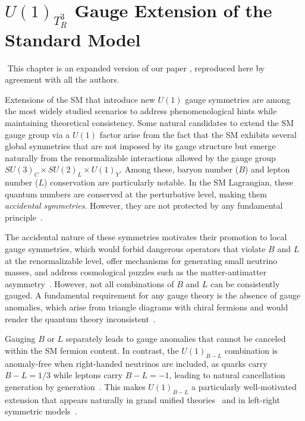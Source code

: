 \chapter{$U(1)_{T^3_R}$ Gauge Extension of the Standard Model}\label{ch:U1T3R}
{$ $ \scriptsize \hfill This chapter is an expanded version of our paper \cite{Qureshi:2024naw}, reproduced here by agreement with all the authors.}

Extensions of the SM that introduce new $U(1)$ gauge symmetries are among the most widely studied scenarios to address phenomenological hints while maintaining theoretical consistency. Some natural candidates to extend the SM gauge group via a $U(1)$ factor arise from the fact that the SM exhibits several global symmetries that are not imposed by its gauge structure but emerge naturally from the renormalizable interactions allowed by the gauge group $SU(3)_C \times SU(2)_L \times U(1)_Y$. Among these, baryon number ($B$) and lepton number ($L$) conservation are particularly notable. In the SM Lagrangian, these quantum numbers are conserved at the perturbative level, making them \textit{accidental symmetries}. However, they are not protected by any fundamental principle~\parencite{Weinberg:1979sa, Wilczek:1979hc}.

The accidental nature of these symmetries motivates their promotion to local gauge symmetries, which would forbid dangerous operators that violate $B$ and $L$ at the renormalizable level, offer mechanisms for generating small neutrino masses, and address cosmological puzzles such as the matter-antimatter asymmetry~\parencite{Marshak:1979fm, Mohapatra:1980yp, Buchmuller:2004nz}. However, not all combinations of $B$ and $L$ can be consistently gauged. A fundamental requirement for any gauge theory is the absence of gauge anomalies, which arise from triangle diagrams with chiral fermions and would render the quantum theory inconsistent~\parencite{Adler:1969gk, Bell:1969ts, tHooft:1980xss}. %

Gauging $B$ or $L$ separately leads to gauge anomalies that cannot be canceled within the SM fermion content. In contrast, the $U(1)_{B-L}$ combination is anomaly-free when right-handed neutrinos are included, as quarks carry $B-L = 1/3$ while leptons carry $B-L = -1$, leading to natural cancellation generation by generation~\parencite{Marshak:1979fm, Mohapatra:1980yp}. This makes $U(1)_{B-L}$ a particularly well-motivated extension that appears naturally in grand unified theories~\parencite{Fritzsch:1974nn, Georgi:1974sy} and in left-right symmetric models~\parencite{Pati:1974yy, Mohapatra:1974hk, Senjanovic:1975rk}.

